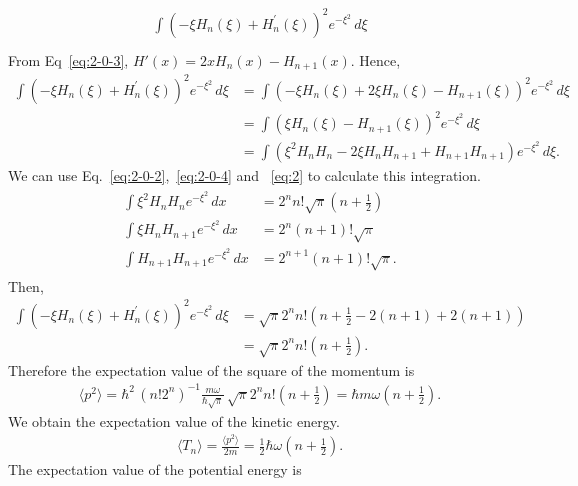 \documentclass[floatfix,nofootinbib,superscriptaddress,fleqn]{revtex4-2}
\begin{document}
\begin{itemize}
\begin{align}
\begin{split}
      \int{(-\xi H_n\left(\xi\right) 
      +H^\prime_n\left(\xi\right))}^2 e^{-\xi^2}\,d\xi  \\
    \end{split}
  \end{align}
  From Eq~\eqref{eq:2-0-3}, $H'(x) = 2xH_{n}(x)-H_{n+1}(x)$. Hence,
  \begin{align}
      \int(-\xi H_n\left(\xi\right) 
      +H^\prime_n\left(\xi\right))^2 e^{-\xi^2}\,d\xi
      &=\int(-\xi H_n\left(\xi\right) 
      + 2\xi H_n(\xi)-H_{n+1}(\xi))^2 e^{-\xi^2}\,d\xi  \\
      &=\int(\xi H_n\left(\xi\right) 
      -H_{n+1}(\xi))^2 e^{-\xi^2}\,d\xi \\
      &=\int
      (\xi^2H_n H_n-2\xi H_n H_{n+1}+H_{n+1}H_{n+1})  
      e^{-\xi^2}\,d\xi.
  \end{align}
  We can use Eq.~\eqref{eq:2-0-2},~\eqref{eq:2-0-4} and 
  ~\eqref{eq:2} to calculate this integration.
  \begin{align}
    \begin{split}
      \int \xi^2 H_n H_n e^{-\xi^2}\,dx 
      &= 2^n n!\sqrt{\pi}\left( n+\frac{1}{2} \right) \\  
      \int \xi H_n H_{n+1} e^{-\xi^2}\,dx 
      &= 2^n(n+1)!\sqrt{\pi}\\  
      \int  H_{n+1} H_{n+1} e^{-\xi^2}\,dx 
      &= 2^{n+1}(n+1)!\sqrt{\pi}.
    \end{split}
  \end{align}
  Then,
  \begin{align}
      \int(-\xi H_n\left(\xi\right) 
      +H^\prime_n\left(\xi\right))^2 e^{-\xi^2}\,d\xi
      &= \sqrt{\pi}2^n n!
      \left(n+\frac{1}{2}-2(n+1)+2(n+1) \right) \\
      &= \sqrt{\pi}2^n n!\left( n+\frac{1}{2} \right).
  \end{align}
  Therefore the expectation value of the square of the momentum is
  \begin{align}\label{eq:3-ps}
    \langle p^2\rangle = \hbar^2\,(n!2^n)^{-1}\frac{m\omega}
    {\hbar\sqrt{\pi}}\,
    \sqrt{\pi}2^n n!\left( n+\frac{1}{2} \right)
    =\hbar m\omega\left( n+\frac{1}{2} \right).
  \end{align}
  We obtain the expectation value of the kinetic energy.
  \begin{align}\label{eq:3-3}
    \langle T_n\rangle=\frac{\langle p^2\rangle}{2m}
    =\frac{1}{2}\hbar \omega\left( n+\frac{1}{2} \right).
  \end{align}
  The expectation value of the potential energy is

\end{itemize}
\end{document}

